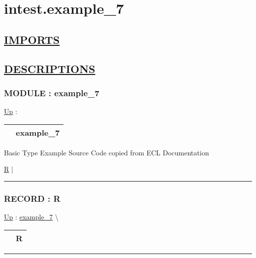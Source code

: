 \chapter*{intest.example\_7}
\hypertarget{ecldoc:toc:intest.example_7}{}

\section*{\underline{IMPORTS}}

\section*{\underline{DESCRIPTIONS}}
\subsection*{MODULE : example\_7}
\hypertarget{ecldoc:intest.example_7}{}
\hyperlink{ecldoc:toc:intest}{Up} :

{\renewcommand{\arraystretch}{1.5}
\begin{tabularx}{\textwidth}{|>{\raggedright\arraybackslash}l|X|}
\hline
\hspace{0pt} & example\_7 \\
\hline
\end{tabularx}
}

\par
Basic Type Example Source Code copied from ECL Documentation


\hyperlink{ecldoc:intest.example_7.r}{R}  |

\rule{\linewidth}{0.5pt}

\subsection*{RECORD : R}
\hypertarget{ecldoc:intest.example_7.r}{}
\hyperlink{ecldoc:intest.example_7}{Up} :
\hspace{0pt} \hyperlink{ecldoc:intest.example_7}{example_7} \textbackslash 

{\renewcommand{\arraystretch}{1.5}
\begin{tabularx}{\textwidth}{|>{\raggedright\arraybackslash}l|X|}
\hline
\hspace{0pt} & R \\
\hline
\end{tabularx}
}

\par


\rule{\linewidth}{0.5pt}


